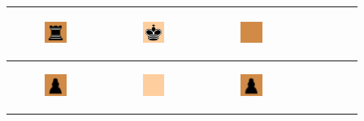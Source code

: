 \documentclass[12pt,a4paper]{article}
\begin{document}
\begin{table}[H]
{\begin{tabular}{|p{20pt}|p{20pt}|p{20pt}|p{20pt}|p{20pt}|p{20pt}|p{20pt}|p{20pt}|}
\begin{minipage}[b]{15pt}
\begin{figure}[H]
	\includegraphics[width=20pt, height=20pt]{LBb.png} 
	\end{figure}
	\end{minipage}
&
\cellcolor{one} 
	\begin{minipage}[b]{15pt}
	\begin{figure}[H]
	\includegraphics[width=20pt, height=20pt]{QBw.png} 
	\end{figure}
	\end{minipage}
&
\cellcolor{two} 
	\begin{minipage}[b]{15pt}
	\begin{figure}[H]
	\includegraphics[width=20pt, height=20pt]{EmptyBlack.png} 
	\end{figure}
	\end{minipage}
\\
\hline
\cellcolor{two} 
	\begin{minipage}[b]{15pt}
	\begin{figure}[H]
	\includegraphics[width=20pt, height=20pt]{PBb.png} 
	\end{figure}
	\end{minipage}
&
\cellcolor{one} 
	\begin{minipage}[b]{15pt}
	\begin{figure}[H]
	\includegraphics[width=20pt, height=20pt]{EmptyWhite.png} 
	\end{figure}
	\end{minipage}
&
\cellcolor{two} 
	\begin{minipage}[b]{15pt}
	\begin{figure}[H]
	\includegraphics[width=20pt, height=20pt]{PBb.png} 
	\end{figure}
	\end{minipage}

\end{tabular}}
\end{table}
\end{document}
